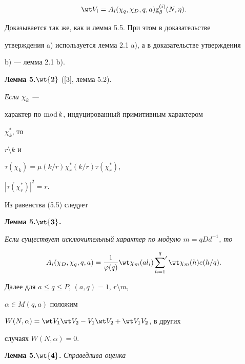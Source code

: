 $$


\wt V_i =A_i(\chi_q, \chi_{D}, q, a)\mathrm g_\beta^{(i)}(N,\eta).


$$





Доказывается так же, как и лемма 5.5. При этом в доказательстве


утверждения a) используется лемма 2.1 a), а в доказательстве утверждения


b) --- лемма 2.1 b).


\medskip





{\bf Лемма 5.$\wt{\bold 2}$} ([3], лемма 5.2).


{\it Если $\chi_{k}$ --- 


характер по $\operatorname{mod} k$, индуцированный примитивным характером 


$\chi_{k}^*$, то


$r\setminus k$ и


$\tau (\chi_{k})=\mu (k/r)\chi_{r}^*(k/r)\tau(\chi_r^*)$,


$|\tau (\chi_r^*)|^2=r$.}


\medskip





Из равенства (5.5) следует





{\bf Лемма 5.$\wt{\bold 3}$.} 


{\it Если существует исключительный характер по модулю $m=qDd^{-1}$, то}


$$


A_i(\chi_{D}, \chi_q, q, a)=\frac1{\varphi(q)}\wt \chi_m


(al_i)\sideset{}{'}\sum_{h=1}^q\wt \chi_m(h)e(h/q).


$$





Далее для $a\le q\le P$, $(a,q)=1$, $r\setminus m$,


$\alpha\in M(q,a)$ положим 


$W(N,\alpha)=\wt V_1\wt V_2 -V_1\wt V_2 +\wt V_1V_2$, в других


случаях $W(N,\alpha)=0$.


\medskip





{\bf Лемма 5.$\wt{\bold 4}$.} {\it Справедлива оценка}


